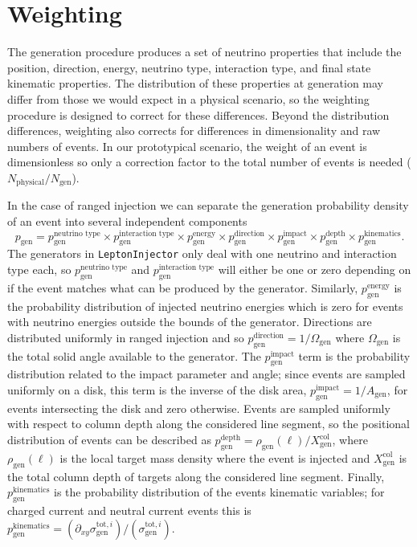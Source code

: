 \documentclass[main.tex]{subfiles}
\newcommand{\LeptonInjector}{\texttt{LeptonInjector}}
\begin{document}
\section{Weighting}\label{sec:weight_append}

The generation procedure produces a set of neutrino properties that include the position, direction, energy, neutrino type, interaction type, and final state kinematic properties.
The distribution of these properties at generation may differ from those we would expect in a physical scenario, so the weighting procedure is designed to correct for these differences.
Beyond the distribution differences, weighting also corrects for differences in dimensionality and raw numbers of events.
In our prototypical scenario, the weight of an event is dimensionless so only a correction factor to the total number of events is needed ($N_\textrm{physical}/N_\textrm{gen}$).

In the case of ranged injection we can separate the generation probability density of an event into several independent components
\begin{equation}
p_\textrm{gen} = p_\textrm{gen}^\textrm{neutrino type} \times p_\textrm{gen}^\textrm{interaction type} \times p_\textrm{gen}^\textrm{energy} \times p_\textrm{gen}^\textrm{direction} \times p_\textrm{gen}^\textrm{impact} \times p_\textrm{gen}^\textrm{depth} \times p_\textrm{gen}^\textrm{kinematics}.
\end{equation}
The generators in \LeptonInjector{} only deal with one neutrino and interaction type each, so $p_\textrm{gen}^\textrm{neutrino type}$ and $p_\textrm{gen}^\textrm{interaction type}$ will either be one or zero depending on if the event matches what can be produced by the generator.
Similarly, $p_\textrm{gen}^\textrm{energy}$ is the probability distribution of injected neutrino energies which is zero for events with neutrino energies outside the bounds of the generator.
Directions are distributed uniformly in ranged injection and so $p_\textrm{gen}^\textrm{direction} = 1/\Omega_\textrm{gen}$ where $\Omega_\textrm{gen}$ is the total solid angle available to the generator.
The $p_\textrm{gen}^\textrm{impact}$ term is the probability distribution related to the impact parameter and angle; since events are sampled uniformly on a disk, this term is the inverse of the disk area, $p_\textrm{gen}^\textrm{impact} = 1/A_\textrm{gen}$, for events intersecting the disk and zero otherwise.
Events are sampled uniformly with respect to column depth along the considered line segment, so the positional distribution of events can be described as $p_\textrm{gen}^\textrm{depth} = \rho_\textrm{gen}(\ell)/X_\textrm{gen}^\textrm{col}$, where $\rho_\textrm{gen}(\ell)$ is the local target mass density where the event is injected and $X_\textrm{gen}^\textrm{col}$ is the total column depth of targets along the considered line segment.
Finally, $p_\textrm{gen}^\textrm{kinematics}$ is the probability distribution of the events kinematic variables; for charged current and neutral current events this is $p_\textrm{gen}^\textrm{kinematics} = (\partial_{xy}\sigma_\textrm{gen}^{\textrm{tot}, i}) / (\sigma_\textrm{gen}^{\textrm{tot}, i})$.
\end{document}
